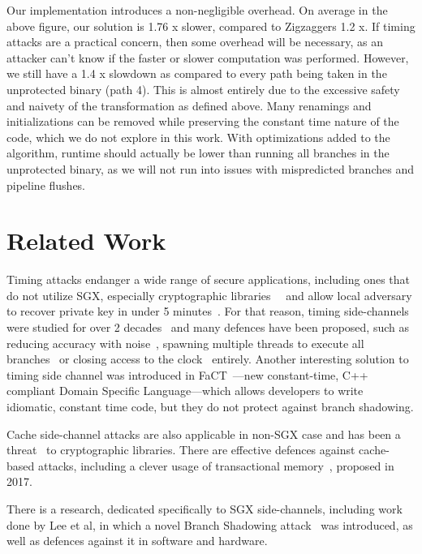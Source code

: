 \documentclass[sigplan, review]{acmart}
\begin{document}
Our implementation introduces a non-negligible overhead. On average in the above figure, our solution is 1.76 x slower, compared to Zigzaggers 1.2 x. If timing attacks are a practical concern, then some overhead will be necessary, as an attacker can’t know if the faster or slower computation was performed. However, we still have a 1.4 x slowdown as compared to every path being taken in the unprotected binary (path 4). This is almost entirely due to the excessive safety and naivety of the transformation as defined above. Many renamings and initializations can be removed while preserving the constant time nature of the code, which we do not explore in this work. With optimizations added to the algorithm, runtime should actually be lower than running all branches in the unprotected binary, as we will not run into issues with mispredicted branches and pipeline flushes.

\section{Related Work}
Timing attacks endanger a wide range of secure applications, including ones that do not utilize SGX, especially cryptographic libraries~\cite{arnaud2013timing}~\cite{garcia2016constant} and allow local adversary to recover private key in under 5 minutes~\cite{schwarz2017malware}. For that reason, timing side-channels were studied for over 2 decades~\cite{kocher1996timing} and many defences have been proposed, such as reducing accuracy with noise~\cite{hu1992reducing}, spawning multiple threads to execute all branches~\cite{devriese2010noninterference} or closing access to the clock~\cite{percival2005cache} entirely. Another interesting solution to timing side channel was introduced in FaCT~\cite{cauligi2017fact}---new constant-time, C++ compliant Domain Specific Language---which allows developers to write idiomatic, constant time code, but they do not protect against branch shadowing.

Cache side-channel attacks are also applicable in non-SGX case and has been a threat~\cite{osvik2006cache} to cryptographic libraries. There are effective defences against cache-based attacks, including a clever usage of transactional memory~\cite{gruss2017strong}, proposed in 2017.

There is a research, dedicated specifically to SGX side-channels, including work done by Lee et al, in which a novel Branch Shadowing attack~\cite{lee2016inferring} was introduced, as well as defences against it in software and hardware.
\end{document}

